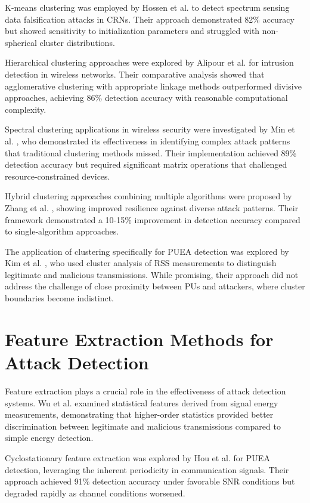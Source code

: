 K-means clustering was employed by Hossen et al. \cite{hossen2015kmeans} to detect spectrum sensing data falsification attacks in CRNs. Their approach demonstrated 82\% accuracy but showed sensitivity to initialization parameters and struggled with non-spherical cluster distributions.

Hierarchical clustering approaches were explored by Alipour et al. \cite{alipour2016hierarchical} for intrusion detection in wireless networks. Their comparative analysis showed that agglomerative clustering with appropriate linkage methods outperformed divisive approaches, achieving 86\% detection accuracy with reasonable computational complexity.

Spectral clustering applications in wireless security were investigated by Min et al. \cite{min2018spectral}, who demonstrated its effectiveness in identifying complex attack patterns that traditional clustering methods missed. Their implementation achieved 89\% detection accuracy but required significant matrix operations that challenged resource-constrained devices.

Hybrid clustering approaches combining multiple algorithms were proposed by Zhang et al. \cite{zhang2019hybrid}, showing improved resilience against diverse attack patterns. Their framework demonstrated a 10-15\% improvement in detection accuracy compared to single-algorithm approaches.

The application of clustering specifically for PUEA detection was explored by Kim et al. \cite{kim2017cluster}, who used cluster analysis of RSS measurements to distinguish legitimate and malicious transmissions. While promising, their approach did not address the challenge of close proximity between PUs and attackers, where cluster boundaries become indistinct.

\section{Feature Extraction Methods for Attack Detection}

Feature extraction plays a crucial role in the effectiveness of attack detection systems. Wu et al. \cite{wu2014feature} examined statistical features derived from signal energy measurements, demonstrating that higher-order statistics provided better discrimination between legitimate and malicious transmissions compared to simple energy detection.

Cyclostationary feature extraction was explored by Hou et al. \cite{hou2015cyclostationary} for PUEA detection, leveraging the inherent periodicity in communication signals. Their approach achieved 91\% detection accuracy under favorable SNR conditions but degraded rapidly as channel conditions worsened.

